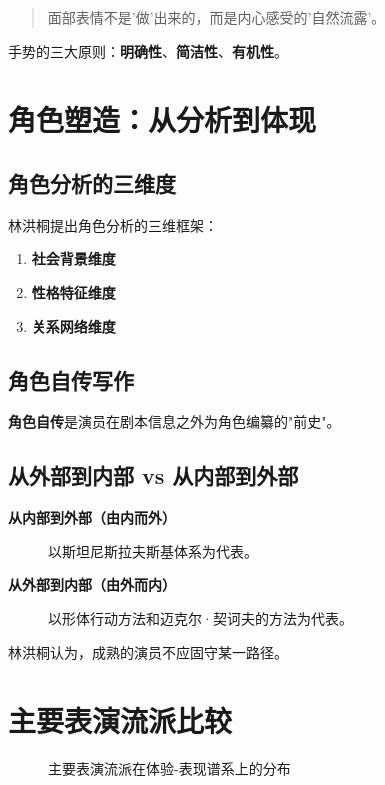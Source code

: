 \begin{quote}
面部表情不是'做'出来的，而是内心感受的'自然流露'。\cite{ye:acting}
\end{quote}

手势的三大原则：\textbf{明确性}、\textbf{简洁性}、\textbf{有机性}。

\section{角色塑造：从分析到体现}

\subsection{角色分析的三维度}

林洪桐提出角色分析的三维框架\cite{lin:acting}：
\begin{enumerate}
    \item \textbf{社会背景维度}
    \item \textbf{性格特征维度}
    \item \textbf{关系网络维度}
\end{enumerate}

\subsection{角色自传写作}

\textbf{角色自传}是演员在剧本信息之外为角色编纂的"前史"。

\subsection{从外部到内部 vs 从内部到外部}

\begin{description}
    \item[\textbf{从内部到外部（由内而外）}] 以斯坦尼斯拉夫斯基体系为代表\cite{stanislavski:system}。
    \item[\textbf{从外部到内部（由外而内）}] 以形体行动方法和迈克尔·契诃夫的方法为代表\cite{chekhov:technique}。
\end{description}

林洪桐认为，成熟的演员不应固守某一路径\cite{lin:acting}。

\section{主要表演流派比较}

\begin{figure}[htbp]
\centering

\caption{主要表演流派在体验-表现谱系上的分布}
\label{fig:acting}
\end{figure}

